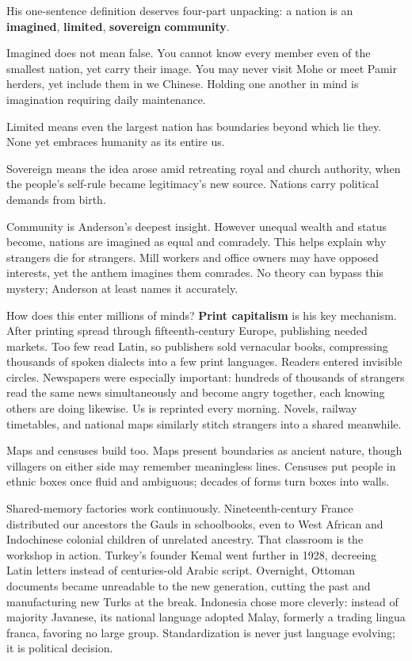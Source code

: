 His one-sentence definition deserves four-part unpacking: a nation is an \textbf{imagined}, \textbf{limited}, \textbf{sovereign} \textbf{community}.

Imagined does not mean false. You cannot know every member even of the smallest nation, yet carry their image. You may never visit Mohe or meet Pamir herders, yet include them in we Chinese. Holding one another in mind is imagination requiring daily maintenance.

Limited means even the largest nation has boundaries beyond which lie they. None yet embraces humanity as its entire us.

Sovereign means the idea arose amid retreating royal and church authority, when the people's self-rule became legitimacy's new source. Nations carry political demands from birth.

Community is Anderson's deepest insight. However unequal wealth and status become, nations are imagined as equal and comradely. This helps explain why strangers die for strangers. Mill workers and office owners may have opposed interests, yet the anthem imagines them comrades. No theory can bypass this mystery; Anderson at least names it accurately.

How does this enter millions of minds? \textbf{Print capitalism} is his key mechanism. After printing spread through fifteenth-century Europe, publishing needed markets. Too few read Latin, so publishers sold vernacular books, compressing thousands of spoken dialects into a few print languages. Readers entered invisible circles. Newspapers were especially important: hundreds of thousands of strangers read the same news simultaneously and become angry together, each knowing others are doing likewise. Us is reprinted every morning. Novels, railway timetables, and national maps similarly stitch strangers into a shared meanwhile.

Maps and censuses build too. Maps present boundaries as ancient nature, though villagers on either side may remember meaningless lines. Censuses put people in ethnic boxes once fluid and ambiguous; decades of forms turn boxes into walls.

Shared-memory factories work continuously. Nineteenth-century France distributed our ancestors the Gauls in schoolbooks, even to West African and Indochinese colonial children of unrelated ancestry. That classroom is the workshop in action. Turkey's founder Kemal went further in 1928, decreeing Latin letters instead of centuries-old Arabic script. Overnight, Ottoman documents became unreadable to the new generation, cutting the past and manufacturing new Turks at the break. Indonesia chose more cleverly: instead of majority Javanese, its national language adopted Malay, formerly a trading lingua franca, favoring no large group. Standardization is never just language evolving; it is political decision.

